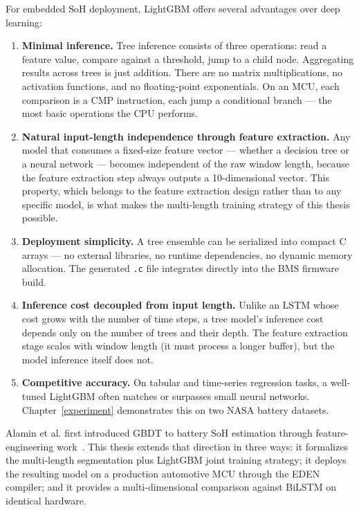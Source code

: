 For embedded SoH deployment, LightGBM offers several advantages over deep learning:

\begin{enumerate}
    \item \textbf{Minimal inference.} Tree inference consists of three operations: read a feature value, compare against a threshold, jump to a child node. Aggregating results across trees is just addition. There are no matrix multiplications, no activation functions, and no floating-point exponentials. On an MCU, each comparison is a CMP instruction, each jump a conditional branch --- the most basic operations the CPU performs.

    \item \textbf{Natural input-length independence through feature extraction.} Any model that consumes a fixed-size feature vector --- whether a decision tree or a neural network --- becomes independent of the raw window length, because the feature extraction step always outputs a 10-dimensional vector. This property, which belongs to the feature extraction design rather than to any specific model, is what makes the multi-length training strategy of this thesis possible.

    \item \textbf{Deployment simplicity.} A tree ensemble can be serialized into compact C arrays --- no external libraries, no runtime dependencies, no dynamic memory allocation. The generated \texttt{.c} file integrates directly into the BMS firmware build.

    \item \textbf{Inference cost decoupled from input length.} Unlike an LSTM whose cost grows with the number of time steps, a tree model's inference cost depends only on the number of trees and their depth. The feature extraction stage scales with window length (it must process a longer buffer), but the model inference itself does not.

    \item \textbf{Competitive accuracy.} On tabular and time-series regression tasks, a well-tuned LightGBM often matches or surpasses small neural networks. Chapter~\ref{experiment} demonstrates this on two NASA battery datasets.
\end{enumerate}

Alamin et al. first introduced GBDT to battery SoH estimation through feature-engineering work~\autocite{feature_eng,alamin2023dataset}. This thesis extends that direction in three ways: it formalizes the multi-length segmentation plus LightGBM joint training strategy; it deploys the resulting model on a production automotive MCU through the EDEN compiler; and it provides a multi-dimensional comparison against BiLSTM on identical hardware.


